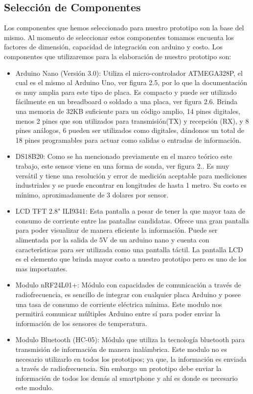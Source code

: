\subsection{Selección de Componentes}
\par 
Los componentes que hemos seleccionado para nuestro prototipo son la base del mismo. Al momento de seleccionar estos componentes tomamos encuenta los factores de dimensión, capacidad de integración con arduino y costo. Los componentes que utilizaremos para la elaboración de nuestro prototipo son:

\begin{itemize}
	\item Arduino Nano (Versión 3.0): Utiliza el micro-controlador ATMEGA328P, el cual es el mismo al Arduino Uno, ver figura 2.5, por lo que la documentación es muy amplia para este tipo de placa. Es compacto y puede ser utilizado fácilmente en un breadboard o soldado a una placa, ver figura 2.6. Brinda una memoria de 32KB suficiente para un código amplio, 14 pines digitales, menos 2 pines que son utilizados para transmisión(TX) y recepción (RX), y 8 pines análogos, 6 pueden ser utilizados como digitales, dándonos un total de 18 pines programables para actuar como salidas o entradas de información.
	
	\item DS18B20: Como se ha mencionado previamente en el marco teórico este trabajo, este sensor viene en una forma de sonda, ver figura 2.. Es muy versátil y tiene una resolución y error de medición aceptable para mediciones industriales y se puede encontrar en longitudes de hasta 1 metro. Su costo es mínimo, aproximadamente de 3 dolares por sensor. 
	
	\item LCD TFT 2.8" ILI9341: Esta pantalla a pesar de tener la que mayor taza de consumo de corriente entre las pantallas candidatas. Ofrece una gran pantalla para poder visualizar de manera eficiente la información. Puede ser alimentada por la salida de 5V de un arduino nano y cuenta con características para ser utilizada como una pantalla táctil. La pantalla LCD es el elemento que brinda mayor costo a nuestro prototipo pero es uno de los mas importantes.
	
	\item Modulo nRF24L01+: Módulo con capacidades de comunicación a través de radiofrecuencia, es sencillo de integrar con cualquier placa Arduino y posee una tasa de consumo de corriente eléctrica mínima. Este modulo nos permitirá comunicar múltiples Arduino entre sí para poder enviar la información de los sensores de temperatura.
	
	\item Modulo Bluetooth (HC-05): Módulo que utiliza la tecnología bluetooth para transmisión de información de manera inalámbrica. Este modulo no es necesario utilizarlo en todos los prototipos; ya que, la información es enviada a través de radiofrecuencia. Sin embargo un prototipo debe enviar la información de todos los demás al smartphone y ahí es donde es necesario este modulo. 
	
\end{itemize}

